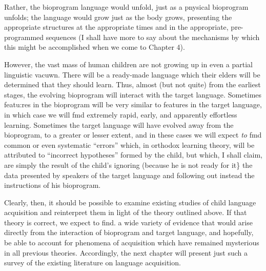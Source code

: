 
Rather, the bioprogram language would unfold, just as a pnysical bioprogram unfolds; the language would grow just as the body grows, presenting the appropriate structures at the appropriate times and in the appropriate, pre-programmed sequences (I shall have more to say about the mechanisms by which this might be accomplished when we come to Chapter 4).

However, the vast mass of human children are not growing up in even a partial linguistic vacuwn. There will be a ready-made language which their elders will be determined that they should learn. Thus, almost (but not quite) from the earliest stages, the evolving bioprogram will interact with the target language. Sometimes featu:res in the bio\-program will be very similar to features in the target language, in which case we will fmd extremely rapid, early, and apparently effortless learning. Sometimes the target language will have evolved away from the bioprogram, to a greater or lesser extent, and in these cases we will expect \textit{to} fmd common or even systematic ``errors'' which, in orthodox learning theory, will be attributed to ``incorrect hypotheses'' formed by the child, but which, I shall claim, are simply the result of the child's ignoring (because he is not ready for it\} the data presented by speakers of the target language and following out instead the instruc\-tions of his bioprogram.
 
Clearly, then, it should be possible to examine existing studies of child language acquisition and reinterpret them in light of the theory outlined above. If that theory is correct, we expect to find. a wide variety of evidence that would arise directly from the interaction of bioprogram and target language, and hopefully, be able to account for phenomena of acquisition which have remained mysterious in all previous theories. Accordingly, the next chapter will present just such a survey of the existing literature on language acquisition. 
